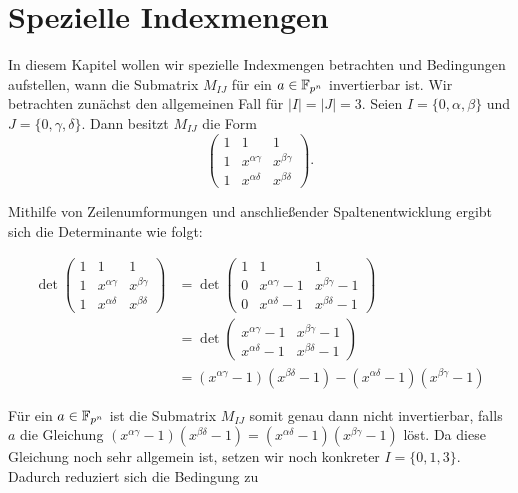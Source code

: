 \section{Spezielle Indexmengen}


In diesem Kapitel wollen wir spezielle Indexmengen betrachten und Bedingungen aufstellen, wann die Submatrix $M_{IJ}$ für ein $a \in \field{p}[n]$ invertierbar ist. Wir betrachten zunächst den allgemeinen Fall für $|I| = |J| = 3$. Seien $I = \{0, \alpha, \beta\}$ und $J = \{0, \gamma, \delta\}$. Dann besitzt $M_{IJ}$ die Form 
\begin{equation*}
    \begin{pmatrix}
        1 & 1 & 1 \\
        1 & x^{\alpha\gamma} & x^{\beta\gamma} \\
        1 & x^{\alpha\delta} & x^{\beta\delta}
    \end{pmatrix}.
\end{equation*}

Mithilfe von Zeilenumformungen und anschließender Spaltenentwicklung ergibt sich die Determinante wie folgt:

\begin{align*}
    \det \begin{pmatrix}
        1 & 1 & 1 \\
        1 & x^{\alpha\gamma} & x^{\beta\gamma} \\
        1 & x^{\alpha\delta} & x^{\beta\delta}
    \end{pmatrix} 
    &= \det \begin{pmatrix}
        1 & 1 & 1 \\
        0 & x^{\alpha\gamma} -1 & x^{\beta\gamma} -1 \\
        0 & x^{\alpha\delta} -1 & x^{\beta\delta} -1
    \end{pmatrix} \\
    &= \det \begin{pmatrix}
        x^{\alpha\gamma} -1 & x^{\beta\gamma} -1 \\
        x^{\alpha\delta} -1 & x^{\beta\delta} -1
    \end{pmatrix} \\
    &= (x^{\alpha\gamma} -1)(x^{\beta\delta} -1) - (x^{\alpha\delta} -1)(x^{\beta\gamma} -1)
\end{align*}

Für ein $a \in \field{p}[n]$ ist die Submatrix $M_{IJ}$ somit genau dann nicht invertierbar, falls $a$ die Gleichung $(x^{\alpha\gamma} -1)(x^{\beta\delta} -1) = (x^{\alpha\delta} -1)(x^{\beta\gamma} -1)$ löst. Da diese Gleichung noch sehr allgemein ist, setzen wir noch konkreter $I = \{0,1,3\}$. Dadurch reduziert sich die Bedingung zu

